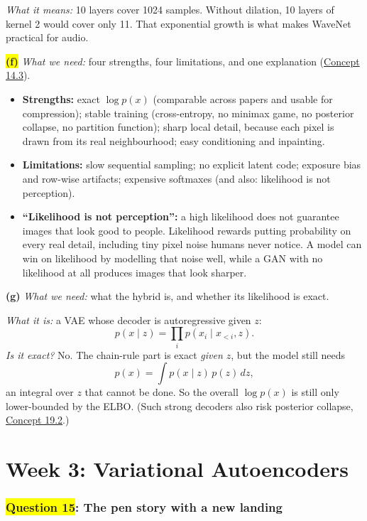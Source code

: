 \documentclass[12pt,a4paper]{article}
\begin{document}
\emph{What it means:} 10 layers cover 1024 samples. Without dilation, 10 layers of kernel 2 would cover only 11. That exponential growth is what makes WaveNet practical for audio.

\colorbox{yellow}{\textbf{(f)}} \emph{What we need:} four strengths, four limitations, and one explanation (\hyperref[c14-3]{Concept 14.3}).
\begin{itemize}[nosep]
  \item \textbf{Strengths:} exact $\log p(x)$ (comparable across papers and usable for compression); stable training (cross-entropy, no minimax game, no posterior collapse, no partition function); sharp local detail, because each pixel is drawn from its real neighbourhood; easy conditioning and inpainting.
  \item \textbf{Limitations:} slow sequential sampling; no explicit latent code; exposure bias and row-wise artifacts; expensive softmaxes (and also: likelihood is not perception).
  \item \textbf{``Likelihood is not perception'':} a high likelihood does not guarantee images that look good to people. Likelihood rewards putting probability on every real detail, including tiny pixel noise humans never notice. A model can win on likelihood by modelling that noise well, while a GAN with no likelihood at all produces images that look sharper.
\end{itemize}

\textbf{(g)} \emph{What we need:} what the hybrid is, and whether its likelihood is exact.

\emph{What it is:} a VAE whose decoder is autoregressive given $z$:
\[
p(x\mid z)=\prod_i p(x_i\mid x_{<i},z).
\]
\emph{Is it exact?} No. The chain-rule part is exact \emph{given $z$}, but the model still needs
\[
p(x)=\int p(x\mid z)\,p(z)\,dz,
\]
an integral over $z$ that cannot be done. So the overall $\log p(x)$ is still only lower-bounded by the ELBO. (Such strong decoders also risk posterior collapse, \hyperref[c19-2]{Concept 19.2}.)
\part{Week 3: Variational Autoencoders}

\section{\texorpdfstring{\colorbox{yellow}{Question 15}}{Question 15}: The pen story with a new landing}
\end{document}
